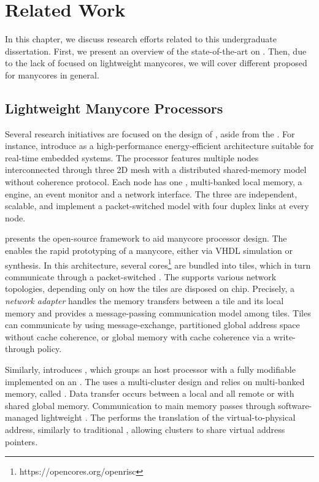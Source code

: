 \chapter{Related Work}
\label{ch.related-work}

In this chapter, we discuss research efforts related to this
undergraduate dissertation.
First, we present an overview of the state-of-the-art on
\lightweight \manycores. Then, due to the
lack of \oss focused on lightweight manycores, we will cover
different proposed \oss for manycores in general.

\section{Lightweight Manycore Processors}
\label{sec.works.manycores}

	Several research initiatives are focused on the design of
	\lightweight \manycores, aside from the \mppa \lightweight \manycore.
	For instance,  introduce
	\epiphany as a high-performance energy-efficient \manycore
	architecture suitable for real-time embedded systems.  The
	processor features multiple nodes interconnected through three 2D mesh
	\nocs with a distributed shared-memory model without coherence
	protocol. Each node has one \risc \cpu, multi-banked local memory,
	a \dma engine, an event monitor and a network interface.  The three
	\nocs are independent, scalable, and implement a packet-switched
	model with four duplex links at every node.

	 presents the open-source \optimsoc framework
	to aid manycore processor design. The \optimsoc
	enables the rapid prototyping of a manycore, either via VHDL
	simulation or \fpga synthesis.
	In this architecture, several \openrisc cores\footnote{https://opencores.org/openrisc} are bundled into
	tiles, which in turn communicate through a packet-switched \noc.
	The \noc supports various network topologies, depending only on how the tiles are disposed on chip.
	Precisely, a \textit{network adapter} handles the memory transfers between
	a tile and its local memory and provides a message-passing communication
	model among tiles.
	Tiles can communicate by using message-exchange, partitioned global
	address space without cache coherence, or global memory
	with cache coherence via a write-through policy.

	Similarly,  introduces \hero, which
	groups an \arm host processor with a fully modifiable
	\riscv \manycore implemented on an \fpga. The \pmca uses a
	multi-cluster design and relies on multi-banked memory, called \spm.
	Data transfer occurs between a local \spm and all remote \spms or
	with shared global memory. Communication to main memory passes
	through software-managed lightweight \rab. The \rab performs the
	translation of the virtual-to-physical address, similarly to
	traditional \mmu, allowing clusters to share virtual address pointers.

